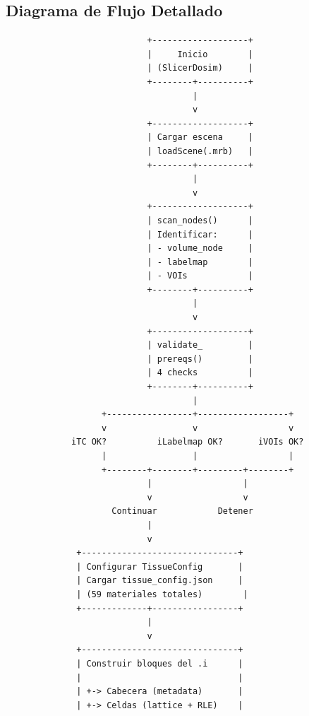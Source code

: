 \documentclass[12pt,a4paper]{article}
\begin{document}
\subsection{Diagrama de Flujo Detallado}

\begin{lstlisting}
                            +-------------------+
                            |     Inicio        |
                            | (SlicerDosim)     |
                            +--------+----------+
                                     |
                                     v
                            +-------------------+
                            | Cargar escena     |
                            | loadScene(.mrb)   |
                            +--------+----------+
                                     |
                                     v
                            +-------------------+
                            | scan_nodes()      |
                            | Identificar:      |
                            | - volume_node     |
                            | - labelmap        |
                            | - VOIs            |
                            +--------+----------+
                                     |
                                     v
                            +-------------------+
                            | validate_         |
                            | prereqs()         |
                            | 4 checks          |
                            +--------+----------+
                                     |
                   +-----------------+------------------+
                   v                 v                  v
             iTC OK?          iLabelmap OK?       iVOIs OK?
                   |                 |                  |
                   +--------+--------+---------+--------+
                            |                  |
                            v                  v
                     Continuar            Detener
                            |
                            v
              +-------------------------------+
              | Configurar TissueConfig       |
              | Cargar tissue_config.json     |
              | (59 materiales totales)        |
              +-------------+-----------------+
                            |
                            v
              +-------------------------------+
              | Construir bloques del .i      |
              |                               |
              | +-> Cabecera (metadata)       |
              | +-> Celdas (lattice + RLE)    |

\end{lstlisting}
\end{document}
